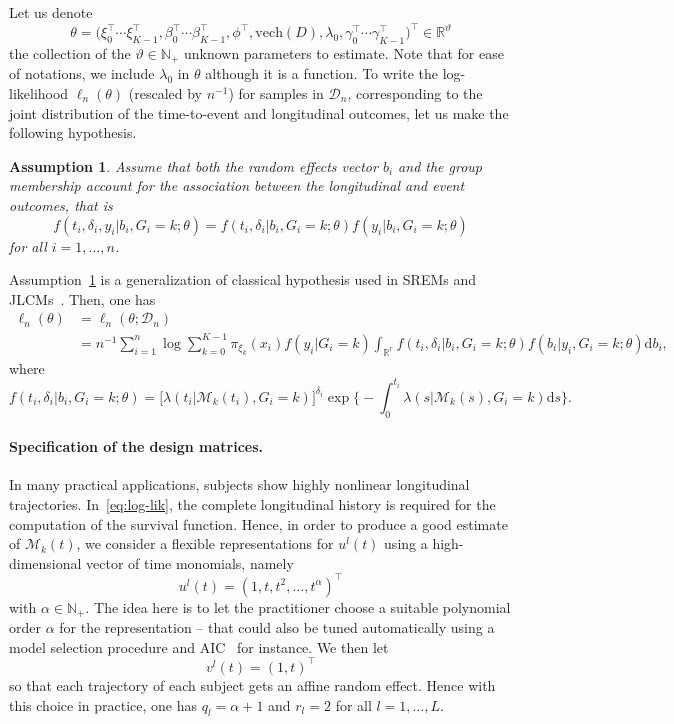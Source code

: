 \documentclass[11pt]{article}
\newtheorem{assumption}{Assumption}{\bf}{\rm}
\newcommand{\dd}{\mathrm{d}}
\newcommand{\cM}{\mathcal M}
\newcommand{\cD}{\mathcal D}
\newcommand{\R}{\mathds R}
\newcommand{\N}{\mathds N}
\begin{document}
Let us denote 
\[ \theta = \big(\xi_0^\top \cdots \xi_{K-1}^\top, \beta_0^\top \cdots \beta_{K-1}^\top, \phi^\top, \text{vech}(D), \lambda_0, \gamma_0^\top \cdots \gamma_{K-1}^\top\big)^\top \in \R^\vartheta \]
the collection of the $\vartheta \in \N_+$ unknown parameters to estimate. Note that for ease of notations, we include $\lambda_0$ in $\theta$ although it is a function.
To write the log-likelihood $\ell_n(\theta)$ (rescaled by $n^{-1}$)  for samples in $\cD_n$, corresponding to the joint distribution of the time-to-event and longitudinal outcomes, let us make the following hypothesis.
\begin{assumption}
\label{indep-hyp-3}
Assume that both the random effects vector $b_i$ and the group membership account for the association between the longitudinal and event outcomes, that is
\begin{equation}
  \label{eq:ind-hyp}
  f(t_i, \delta_i, y_i | b_i, G_i = k ; \theta) = f(t_i, \delta_i| b_i, G_i = k ; \theta) f(y_i | b_i, G_i = k ; \theta)
\end{equation}
for all $i=1, \ldots, n$.
\end{assumption}
Assumption~\ref{indep-hyp-3} is a generalization of classical hypothesis used in SREMs and JLCMs~\citep{hickey2016joint}.
Then, one has
\begin{align}
	\label{eq:log-lik}
	\ell_n(\theta) &= \ell_n(\theta ; \cD_n) \nonumber \\
	&= n^{-1} \sum_{i=1}^n \log \sum_{k=0}^{K-1} \pi_{\xi_k}(x_i) f(y_i | G_i = k)\int_{\R^r} f(t_i, \delta_i| b_i, G_i = k ; \theta) f(b_i | y_i, G_i = k; \theta) \dd b_i,
\end{align}
where 
\[f(t_i, \delta_i| b_i, G_i = k ; \theta) = \big[\lambda(t_i|\cM_k(t_i), G_i = k)\big]^{\delta_i} \exp \Big\{-\int_0^{t_i} \lambda(s|\cM_k(s), G_i = k) \dd s \Big\}. \]

\paragraph{Specification of the design matrices.}
 
In many practical applications, subjects show highly nonlinear longitudinal trajectories. In~\eqref{eq:log-lik}, the complete longitudinal history is required for the computation of the survival function. Hence, in order to produce a good estimate of $\cM_k(t)$, we consider a flexible representations for $u^l(t)$ using a high-dimensional vector of time monomials, namely 
\[u^l(t) = (1, t, t^2, \ldots, t^\alpha)^\top\]
with $\alpha \in \N_+$.
The idea here is to let the practitioner choose a suitable polynomial order $\alpha$ for the representation -- that could also be tuned automatically using a model selection procedure and AIC~\citep{akaike1974new} for instance.
We then let \[v^l(t) = (1, t)^\top\] so that each trajectory of each subject gets an affine random effect. Hence with this choice in practice, one has $q_l=\alpha + 1$ and $r_l=2$ for all $l=1, \ldots, L$.
\end{document}
